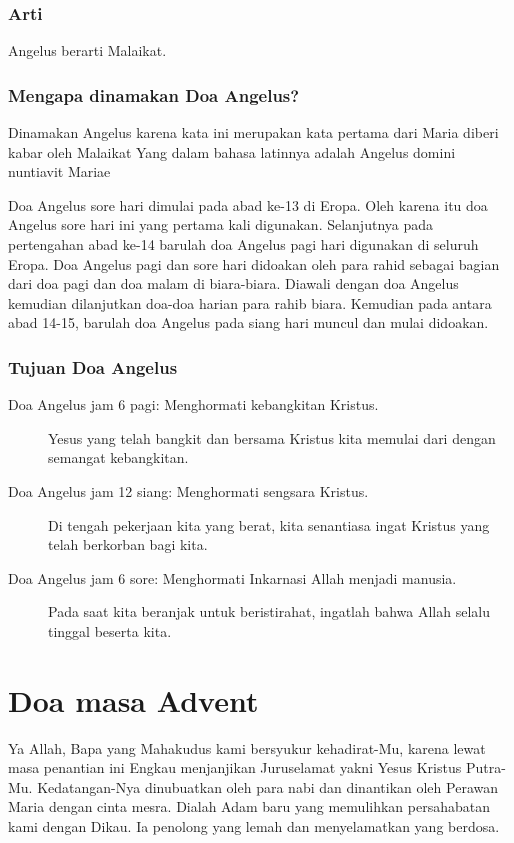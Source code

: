 \subsubsection[Arti]{Arti}
{\textquotedbl}Angelus{\textquotedbl} berarti
{\textquotedbl}Malaikat{\textquotedbl}.

\subsubsection[Mengapa dinamakan Doa Angelus?]{Mengapa dinamakan Doa
Angelus?}
Dinamakan Angelus karena kata ini merupakan kata pertama dari
{\textquotedbl}Maria diberi kabar oleh Malaikat{\textquotedbl} Yang
dalam bahasa latinnya adalah {\textquotedbl}Angelus domini nuntiavit
Mariae{\textquotedbl}

Doa Angelus sore hari dimulai pada abad ke-13 di Eropa. Oleh karena itu
doa Angelus sore hari ini yang pertama kali digunakan. Selanjutnya pada
pertengahan abad ke-14 barulah doa Angelus pagi hari digunakan di
seluruh Eropa. Doa Angelus pagi dan sore hari didoakan oleh para rahid
sebagai bagian dari doa pagi dan doa malam di biara-biara. Diawali
dengan doa Angelus kemudian dilanjutkan doa-doa harian para rahib
biara. Kemudian pada antara abad 14-15, barulah doa Angelus pada siang
hari muncul dan mulai didoakan.

\subsubsection[Tujuan Doa Angelus]{Tujuan Doa Angelus}
\begin{description} 
\item[Doa Angelus jam 6 pagi: Menghormati kebangkitan Kristus.]

Yesus yang telah bangkit dan bersama Kristus kita memulai dari dengan
semangat kebangkitan.

\item [Doa Angelus jam 12 siang: Menghormati sengsara Kristus.]

Di tengah pekerjaan kita yang berat, kita senantiasa ingat Kristus yang
telah berkorban bagi kita.

\item [Doa Angelus jam 6 sore: Menghormati Inkarnasi Allah menjadi manusia.]

Pada saat kita beranjak untuk beristirahat, ingatlah bahwa Allah selalu
tinggal beserta kita.
\end{description}

\small
\section[Doa masa Advent]{Doa masa Advent}
Ya Allah, Bapa yang Mahakudus kami bersyukur kehadirat-Mu, karena lewat
masa penantian ini Engkau menjanjikan Juruselamat yakni Yesus Kristus
Putra-Mu. Kedatangan-Nya dinubuatkan oleh para nabi dan dinantikan oleh
Perawan Maria dengan cinta mesra. Dialah Adam baru yang memulihkan
persahabatan kami dengan Dikau. Ia penolong yang lemah dan
menyelamatkan yang berdosa.

